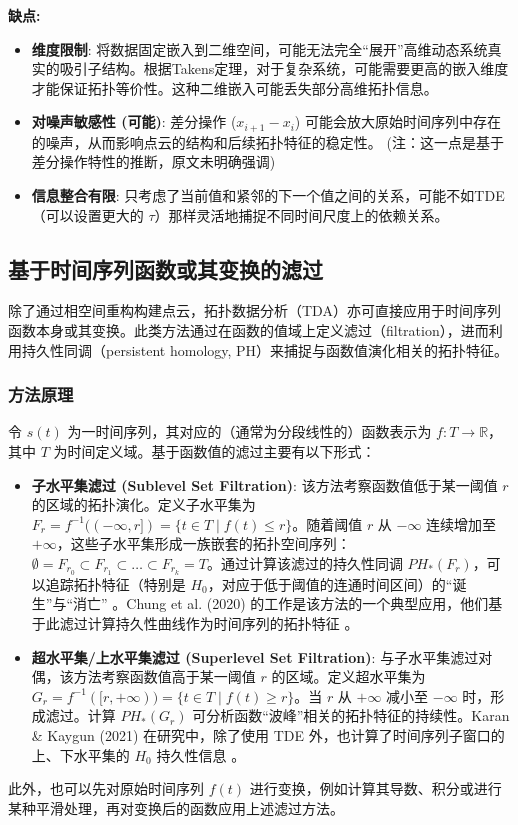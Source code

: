 \textbf{缺点:}
\begin{itemize}
    \item \textbf{维度限制}: 将数据固定嵌入到二维空间，可能无法完全“展开”高维动态系统真实的吸引子结构。根据Takens定理，对于复杂系统，可能需要更高的嵌入维度才能保证拓扑等价性。这种二维嵌入可能丢失部分高维拓扑信息。
    \item \textbf{对噪声敏感性 (可能)}: 差分操作 ($x_{i+1} - x_i$) 可能会放大原始时间序列中存在的噪声，从而影响点云的结构和后续拓扑特征的稳定性。 (注：这一点是基于差分操作特性的推断，原文未明确强调)
    \item \textbf{信息整合有限}: 只考虑了当前值和紧邻的下一个值之间的关系，可能不如TDE（可以设置更大的 $\tau$）那样灵活地捕捉不同时间尺度上的依赖关系。
\end{itemize}

\subsection{基于时间序列函数或其变换的滤过}
\label{sec:func_filtration}
除了通过相空间重构构建点云，拓扑数据分析（TDA）亦可直接应用于时间序列函数本身或其变换。此类方法通过在函数的值域上定义滤过（filtration），进而利用持久性同调（persistent homology, PH）来捕捉与函数值演化相关的拓扑特征。
\subsubsection{方法原理}
\label{sec:func_filtration_principle}

令 $s(t)$ 为一时间序列，其对应的（通常为分段线性的）函数表示为 $f: T \to \mathbb{R}$，其中 $T$ 为时间定义域。基于函数值的滤过主要有以下形式：
\begin{itemize}
    \item \textbf{子水平集滤过 (Sublevel Set Filtration)}: 该方法考察函数值低于某一阈值 $r$ 的区域的拓扑演化。定义子水平集为 $F_r = f^{-1}((-\infty, r]) = \{t \in T \mid f(t) \le r\}$。随着阈值 $r$ 从 $-\infty$ 连续增加至 $+\infty$，这些子水平集形成一族嵌套的拓扑空间序列：$\emptyset = F_{r_0} \subset F_{r_1} \subset \dots \subset F_{r_k} = T$。通过计算该滤过的持久性同调 $PH_*(F_r)$，可以追踪拓扑特征（特别是 $H_0$，对应于低于阈值的连通时间区间）的“诞生”与“消亡” \cite{Chung2020PHApproachTSC}。Chung et al. (2020) 的工作是该方法的一个典型应用，他们基于此滤过计算持久性曲线作为时间序列的拓扑特征 \cite{Chung2020PHApproachTSC}。

    \item \textbf{超水平集/上水平集滤过 (Superlevel Set Filtration)}: 与子水平集滤过对偶，该方法考察函数值高于某一阈值 $r$ 的区域。定义超水平集为 $G_r = f^{-1}([r, +\infty)) = \{t \in T \mid f(t) \ge r\}$。当 $r$ 从 $+\infty$ 减小至 $-\infty$ 时，形成滤过。计算 $PH_*(G_r)$ 可分析函数“波峰”相关的拓扑特征的持续性。Karan \& Kaygun (2021) 在研究中，除了使用 TDE 外，也计算了时间序列子窗口的上、下水平集的 $H_0$ 持久性信息 \cite{Karan2021TSClassificationViaTDA}。
\end{itemize}
此外，也可以先对原始时间序列 $f(t)$ 进行变换，例如计算其导数、积分或进行某种平滑处理，再对变换后的函数应用上述滤过方法。

